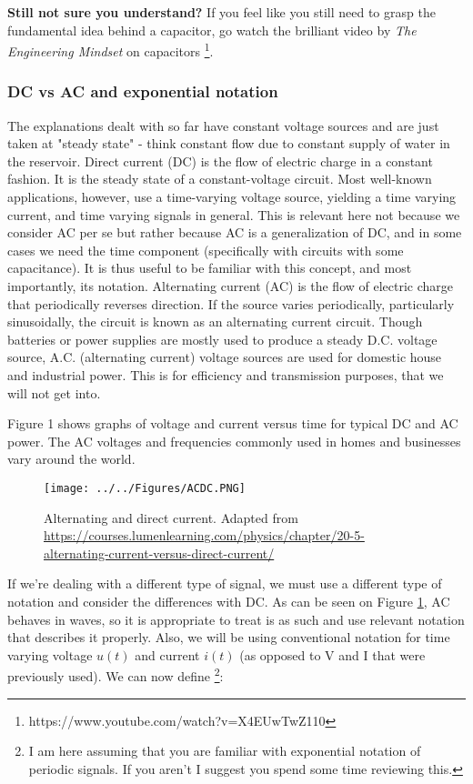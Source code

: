 \textbf{Still not sure you understand?} If you feel like you still need to grasp the fundamental idea behind a capacitor, go watch the brilliant video by \textit{The Engineering Mindset} on capacitors \footnote{https://www.youtube.com/watch?v=X4EUwTwZ110}.

\subsubsection{DC vs AC and exponential notation}

The explanations dealt with so far have constant voltage sources and are just taken at "steady state" - think constant flow due to constant supply of water in the reservoir. Direct current (DC) is the flow of electric charge in a constant fashion. It is the steady state of a constant-voltage circuit. Most well-known applications, however, use a time-varying voltage source, yielding a time varying current, and time varying signals in general. This is relevant here not because we consider AC per se but rather because AC is a generalization of DC, and in some cases we need the time component (specifically with circuits with some capacitance). It is thus useful to be familiar with this concept, and most importantly, its notation. Alternating current (AC) is the flow of electric charge that periodically reverses direction. If the source varies periodically, particularly sinusoidally, the circuit is known as an alternating current circuit. Though batteries or power supplies are mostly used to produce a steady D.C. voltage source, A.C. (alternating current) voltage sources are used for domestic house and industrial power. This is for efficiency and transmission purposes, that we will not get into.

Figure 1 shows graphs of voltage and current versus time for typical DC and AC power. The AC voltages and frequencies commonly used in homes and businesses vary around the world. 

\begin{figure}[H]
    \centering
    \texttt{[image: ../../Figures/ACDC.PNG]}
    \caption{Alternating and direct current. Adapted from \url{https://courses.lumenlearning.com/physics/chapter/20-5-alternating-current-versus-direct-current/}}
    \label{fig:ACDC}
\end{figure}

If we're dealing with a different type of signal, we must use a different type of notation and consider the differences with DC. As can be seen on Figure \ref{fig:ACDC}, AC behaves in waves, so it is appropriate to treat is as such and use relevant notation that describes it properly. Also, we will be using conventional notation for time varying voltage $u(t)$ and current $i(t)$ (as opposed to V and I that were previously used). We can now define \footnote{I am here assuming that you are familiar with exponential notation of periodic signals. If you aren't I suggest you spend some time reviewing this.}:  

